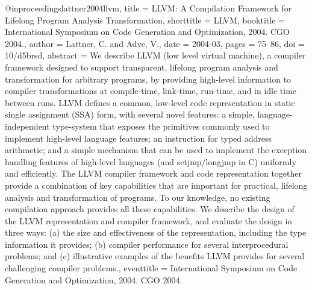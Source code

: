 @inproceedings{lattner2004llvm,
  title = {{{LLVM}}: A Compilation Framework for Lifelong Program Analysis Transformation},
  shorttitle = {{{LLVM}}},
  booktitle = {International {{Symposium}} on {{Code Generation}} and {{Optimization}}, 2004. {{CGO}} 2004.},
  author = {Lattner, C. and Adve, V.},
  date = {2004-03},
  pages = {75--86},
  doi = {10/d5brsd},
  abstract = {We describe LLVM (low level virtual machine), a compiler framework designed to support transparent, lifelong program analysis and transformation for arbitrary programs, by providing high-level information to compiler transformations at compile-time, link-time, run-time, and in idle time between runs. LLVM defines a common, low-level code representation in static single assignment (SSA) form, with several novel features: a simple, language-independent type-system that exposes the primitives commonly used to implement high-level language features; an instruction for typed address arithmetic; and a simple mechanism that can be used to implement the exception handling features of high-level languages (and setjmp/longjmp in C) uniformly and efficiently. The LLVM compiler framework and code representation together provide a combination of key capabilities that are important for practical, lifelong analysis and transformation of programs. To our knowledge, no existing compilation approach provides all these capabilities. We describe the design of the LLVM representation and compiler framework, and evaluate the design in three ways: (a) the size and effectiveness of the representation, including the type information it provides; (b) compiler performance for several interprocedural problems; and (c) illustrative examples of the benefits LLVM provides for several challenging compiler problems.},
  eventtitle = {International {{Symposium}} on {{Code Generation}} and {{Optimization}}, 2004. {{CGO}} 2004.}
}

